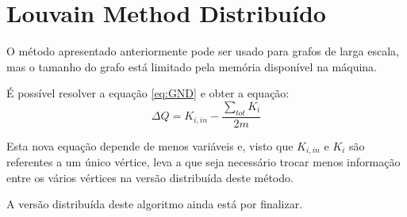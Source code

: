 \documentclass[a4paper,10pt]{report}
\begin{document}
\newpage
\section*{Louvain Method Distribuído}
O método apresentado anteriormente pode ser usado para grafos de larga escala, mas o tamanho do grafo está limitado pela memória disponível na máquina.

É possível resolver a equação \ref{eq:GND} e obter a equação:
\begin{equation}
	\Delta Q  =  K_{i,in} - \frac{\sum_{tot} K_i}{2m}
\label{eq:GD}
\end{equation}


Esta nova equação depende de menos variáveis e, visto que $K_{i,in}$ e $K_i$ são referentes a um único vértice, leva a que seja necessário trocar menos informação entre os vários vértices na versão distribuída deste método.

A versão distribuída deste algoritmo ainda está por finalizar.

%
\end{document}
